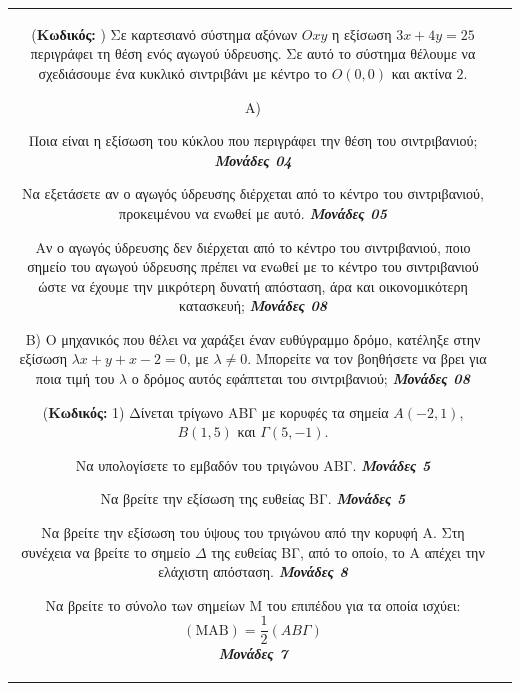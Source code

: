 \documentclass[11pt,a4paper,twoside]{book}
\newcounter{askhsh}[chapter]
\renewcommand{\theaskhsh}{
	\bf{\titlefont{\Large{\thechapter}}.\arabic{askhsh}}
}
\newcommand{\Askhsh}[2]{\refstepcounter{askhsh}{\vspace{4mm}\titlefont{{\large Άσκηση}\theaskhsh} - \textcolor{maincolor}{ΘEMA #2}} ({\small{\textbf{Κωδικός:} #1}})}{}
\newcommand{\monades}[1]{
\hspace*{\fill}
\textbf{\textit{\textcolor{maincolor}{Μονάδες #1}}}}
\begin{document}
\begin{tabular}{cc}
\vspace{4mm}

\Askhsh{}{4}
Σε καρτεσιανό σύστημα αξόνων $Oxy$ η εξίσωση $3x + 4y = 25$ περιγράφει τη θέση ενός αγωγού ύδρευσης. Σε αυτό το σύστημα θέλουμε να σχεδιάσουμε ένα κυκλικό σιντριβάνι με κέντρο το $O(0,0)$ και ακτίνα $2$.

\begin{alist}    \item Α)
    \begin{rlist}
        \item Ποια είναι η εξίσωση του κύκλου που περιγράφει την θέση του σιντριβανιού; \monades{04}
        \item Να εξετάσετε αν ο αγωγός ύδρευσης διέρχεται από το κέντρο του σιντριβανιού, προκειμένου να ενωθεί με αυτό. \monades{05}
        \item Αν ο αγωγός ύδρευσης δεν διέρχεται από το κέντρο του σιντριβανιού, ποιο σημείο του αγωγού ύδρευσης πρέπει να ενωθεί με το κέντρο του σιντριβανιού ώστε να έχουμε την μικρότερη δυνατή απόσταση, άρα και οικονομικότερη κατασκευή; \monades{08}
    \end{rlist}
    \item Β) Ο μηχανικός που θέλει να χαράξει έναν ευθύγραμμο δρόμο, κατέληξε στην εξίσωση $\lambda x + y + x - 2 = 0$, με $\lambda \ne 0$. Μπορείτε να τον βοηθήσετε να βρει για ποια τιμή του $\lambda$ ο δρόμος αυτός εφάπτεται του σιντριβανιού; \monades{08}\end{alist}

\vspace{4mm}

\Askhsh{1}{4}
Δίνεται τρίγωνο ΑΒΓ με κορυφές τα σημεία $A(-2, 1)$, $B(1, 5)$ και $\Gamma(5, -1)$.
\begin{alist}    \item Να υπολογίσετε το εμβαδόν του τριγώνου ΑΒΓ. \monades{5}
    \item Να βρείτε την εξίσωση της ευθείας ΒΓ. \monades{5}
    \item Να βρείτε την εξίσωση του ύψους του τριγώνου από την κορυφή Α. Στη συνέχεια να βρείτε το σημείο $\Delta$ της ευθείας ΒΓ, από το οποίο, το Α απέχει την ελάχιστη απόσταση. \monades{8}
    \item Να βρείτε το σύνολο των σημείων Μ του επιπέδου για τα οποία ισχύει:
 \[ (\text{MAB}) = \frac{1}{2} (AB\Gamma) \] \monades{7}\end{alist}

\vspace{4mm}


\end{tabular}
\end{document}
